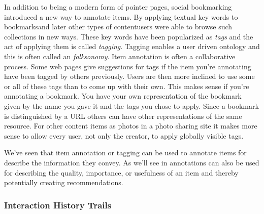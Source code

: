 In addition to being a modern form of pointer pages, social bookmarking
introduced a new way to annotate items. By applying textual key words to
bookmarks\dash{}and later other types of content\dash{}users were able to
browse such collections in new ways. These key words have been popularized as
\emph{tags} and the act of applying them is called \emph{tagging}. Tagging
enables a user driven ontology%
and this is often called an \emph{folksonomy}.
Item annotation is often a collaborative process. Some web pages give
suggestions for tags if the item you're annotating have been tagged by others
previously. Users are then more inclined to use some or all of these tags than
to come up with their own. This makes sense if you're annotating a bookmark.
You have your own representation of the bookmark given by the name you gave it
and the tags you chose to apply. Since a bookmark is distinguished by a
URL others can have other representations of the same resource. For other
content items as photos in a photo sharing site it makes more sense to allow
every user, not only the creator, to apply globally visible tags.



We've seen that item annotation or tagging can be used to annotate items for
describe the information they convey. As we'll see in
annotations can also be used for describing the quality, importance, or
usefulness of an item and thereby potentially creating recommendations.

\subsubsection{Interaction History Trails}
\label{section:background.social.navigation.applied.forms.interaction.history}

